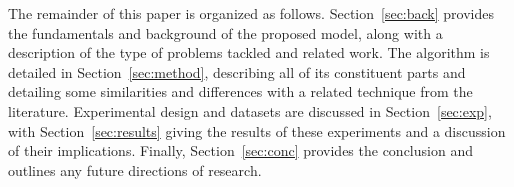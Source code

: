 The remainder of this paper is organized as follows. Section~\ref{sec:back} provides the fundamentals and background of the proposed model, along with a description of the type of problems tackled and related work. The \AlgName{} algorithm is detailed in Section~\ref{sec:method}, describing all of its constituent parts and detailing some similarities and differences with a related technique from the literature. Experimental design and datasets are discussed in Section~\ref{sec:exp}, with Section~\ref{sec:results} giving the results of these experiments and a discussion of their implications. Finally, Section~\ref{sec:conc} provides the conclusion and outlines any future directions of research.

